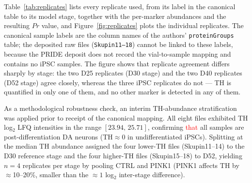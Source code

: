\documentclass[5p,times,twocolumn]{elsarticle}
\newcommand{\rtag}[1]{}
\newenvironment{revblock}[1]{\par\color{red}\rtag{#1}\ignorespaces}{\par}
\newcommand{\lang}[1]{\textcolor{red}{#1}}
\begin{document}
\begin{revblock}{R2.5,R2.11}
  Table~\ref{tab:replicates} lists every replicate used, from
  its label in the canonical table to its model stage, together
  with the per-marker abundances and the resulting $Pr$ value,
  and Figure~\ref{fig:replicates} plots the individual
  replicates.
  The canonical sample labels are the column names of the
  authors' \texttt{proteinGroups} table; the deposited raw files
  (\texttt{Skupin11--18}) cannot be linked to these labels,
  because the PRIDE deposit does not record the vial-to-sample
  mapping and contains no iPSC samples.
  The figure shows that replicate agreement differs sharply by
  stage: the two D25 replicates (D30 stage) and the two D40
  replicates (D52 stage) agree closely, whereas the three iPSC
  replicates do not --- TH is quantified in only one of them,
  and no other marker is detected in any of them.
\end{revblock}



As a methodological robustness check, an interim
TH-abundance stratification was applied prior to receipt
of the canonical mapping.
All eight files exhibited TH log$_{2}$ LFQ intensities in
the range $[23.94,\,25.71]$, confirming \lang{that} all samples are
post-differentiation DA neurons ($\text{TH} \approx 0$
in undifferentiated iPSCs).
Splitting at the median TH abundance assigned the four
lower-TH files (Skupin11--14) to the D30 reference stage
and the four higher-TH files (Skupin15--18) to D52,
yielding $n = 4$ replicates per stage by pooling CTRL and
PINK1 (PINK1 affects TH by $\approx$10--20\%, smaller than
the $\approx 1$ log$_{2}$ inter-stage difference).
\end{document}
